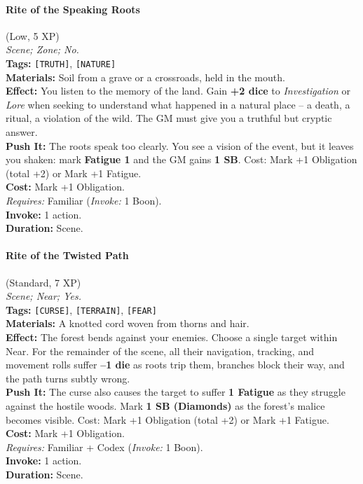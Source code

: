 \paragraph{Rite of the Speaking Roots} (Low, 5 XP) \hfill \\
\emph{Scene; Zone; No.} \\
\textbf{Tags:} \texttt{[TRUTH]}, \texttt{[NATURE]} \\
\textbf{Materials:} Soil from a grave or a crossroads, held in the mouth. \\
\textbf{Effect:} You listen to the memory of the land. Gain \textbf{+2 dice} to \textit{Investigation} or \textit{Lore} when seeking to understand what happened in a natural place -- a death, a ritual, a violation of the wild. The GM must give you a truthful but cryptic answer. \\
\textbf{Push It:} The roots speak too clearly. You see a vision of the event, but it leaves you shaken: mark \textbf{Fatigue 1} and the GM gains \textbf{1 SB}. Cost: Mark +1 Obligation (total +2) or Mark +1 Fatigue. \\
\textbf{Cost:} Mark +1 Obligation. \\
\textit{Requires:} Familiar (\textit{Invoke:} 1 Boon). \\
\textbf{Invoke:} 1 action. \\
\textbf{Duration:} Scene.

\paragraph{Rite of the Twisted Path} (Standard, 7 XP) \hfill \\
\emph{Scene; Near; Yes.} \\
\textbf{Tags:} \texttt{[CURSE]}, \texttt{[TERRAIN]}, \texttt{[FEAR]} \\
\textbf{Materials:} A knotted cord woven from thorns and hair. \\
\textbf{Effect:} The forest bends against your enemies. Choose a single target within Near. For the remainder of the scene, all their navigation, tracking, and movement rolls suffer \textbf{--1 die} as roots trip them, branches block their way, and the path turns subtly wrong. \\
\textbf{Push It:} The curse also causes the target to suffer \textbf{1 Fatigue} as they struggle against the hostile woods. Mark \textbf{1 SB (Diamonds)} as the forest's malice becomes visible. Cost: Mark +1 Obligation (total +2) or Mark +1 Fatigue. \\
\textbf{Cost:} Mark +1 Obligation. \\
\textit{Requires:} Familiar + Codex (\textit{Invoke:} 1 Boon). \\
\textbf{Invoke:} 1 action. \\
\textbf{Duration:} Scene.

